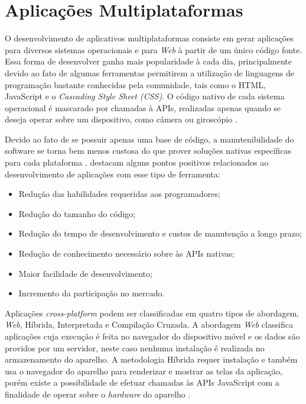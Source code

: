 \section{Aplicações Multiplataformas}

O desenvolvimento de aplicativos multiplataformas consiste em gerar aplicações para diversos sistemas operacionais e para \textit{Web} à partir de um único código fonte. Essa forma de desenvolver ganha mais popularidade à cada dia, principalmente devido ao fato de algumas ferramentas permitirem a utilização de linguagens de programação bastante conhecidas pela comunidade, tais como o HTML, JavaScript e o \textit{Cascading Style Sheet (CSS)}. O código nativo de cada sistema operacional é mascarado por chamadas à APIs, realizadas apenas quando se deseja operar sobre um dispositivo, como câmera ou giroscópio \cite{raj2012study, palmieri2012comparison, dalmasso2013survey}.

Devido ao fato de se possuir apenas uma base de código, a manutenibilidade do software se torna bem menos custosa do que prover soluções nativas específicas para cada plataforma \cite{raj2012study}.  destacam alguns pontos positivos relacionados ao desenvolvimento de aplicações com esse tipo de ferramenta:

\begin{itemize}
\item Redução das habilidades requeridas aos programadores;
\item Redução do tamanho do código;
\item Redução do tempo de desenvolvimento e custos de manutenção a longo prazo;
\item Redução de conhecimento necessário sobre às APIs nativas;
\item Maior facilidade de desenvolvimento;
\item Incremento da participação no mercado.
\end{itemize}


Aplicações \textit{cross-platform} podem ser classificadas em quatro tipos de abordagem, \textit{Web}, Híbrida, Interpretada e Compilação Cruzada. A abordagem \textit{Web} classifica aplicações cuja execução é feita no navegador do dispositivo móvel e os dados são providos por um servidor, neste caso nenhuma instalação é realizada no armazenamento do aparelho. A metodologia Híbrida requer instalação e também usa o navegador do aparelho para renderizar e mostrar as telas da aplicação, porém existe a possibilidade de efetuar chamadas às APIs JavaScript com a finalidade de operar sobre o \textit{hardware} do aparelho \cite{raj2012study, dalmasso2013survey}.

